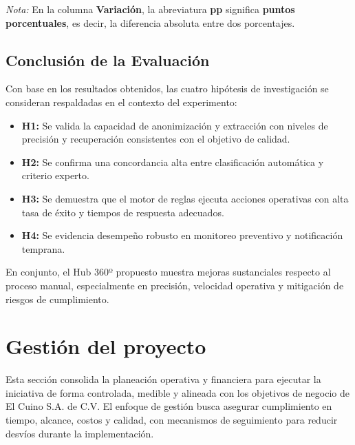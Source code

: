 \documentclass[12pt]{article}
\begin{document}
\noindent\textit{Nota:} En la columna \textbf{Variación}, la abreviatura \textbf{pp} significa \textbf{puntos porcentuales}, es decir, la diferencia absoluta entre dos porcentajes.

\subsection{Conclusión de la Evaluación}

Con base en los resultados obtenidos, las cuatro hipótesis de investigación se consideran respaldadas en el contexto del experimento:

\begin{itemize}
    \item \textbf{H1:} Se valida la capacidad de anonimización y extracción con niveles de precisión y recuperación consistentes con el objetivo de calidad.
    \item \textbf{H2:} Se confirma una concordancia alta entre clasificación automática y criterio experto.
    \item \textbf{H3:} Se demuestra que el motor de reglas ejecuta acciones operativas con alta tasa de éxito y tiempos de respuesta adecuados.
    \item \textbf{H4:} Se evidencia desempeño robusto en monitoreo preventivo y notificación temprana.
\end{itemize}

En conjunto, el Hub 360º propuesto muestra mejoras sustanciales respecto al proceso manual, especialmente en precisión, velocidad operativa y mitigación de riesgos de cumplimiento.


\section{Gestión del proyecto}

Esta sección consolida la planeación operativa y financiera para ejecutar la iniciativa de forma controlada, medible y alineada con los objetivos de negocio de El Cuino S.A. de C.V. El enfoque de gestión busca asegurar cumplimiento en tiempo, alcance, costos y calidad, con mecanismos de seguimiento para reducir desvíos durante la implementación.

\end{document}
